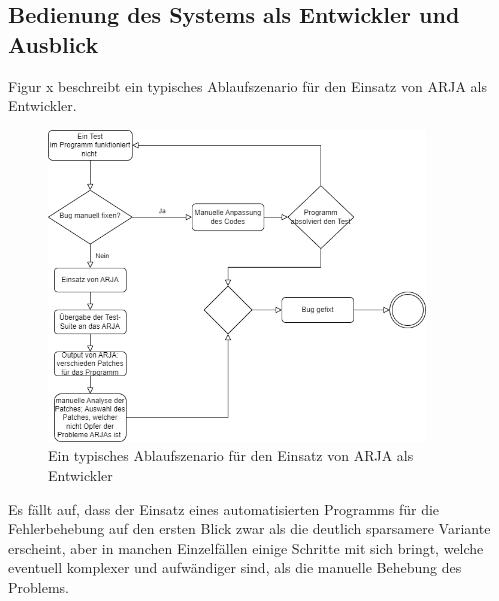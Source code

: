 \documentclass[11pt,a4paper]{article}
\begin{document}
\subsection{Bedienung des Systems als Entwickler und Ausblick}
Figur x beschreibt ein typisches Ablaufszenario für den Einsatz von ARJA als Entwickler.
\begin{figure}[h!]
\includegraphics[width=100mm,scale=0.3, center]{ablauf.png}
\caption{Ein typisches Ablaufszenario für den Einsatz von ARJA als Entwickler}
\label{fig:figure4}
\end{figure}

Es fällt auf, dass der Einsatz eines automatisierten Programms für die Fehlerbehebung auf den ersten Blick zwar als die deutlich sparsamere Variante erscheint, aber in manchen Einzelfällen einige Schritte mit sich bringt, welche eventuell komplexer und aufwändiger sind, als die manuelle Behebung des Problems. 
\end{document}
